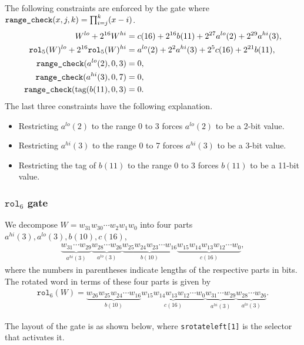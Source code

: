 \documentclass[10pt]{article}
\begin{document}
The following constraints are enforced by the gate where $\texttt{range\textunderscore check}(x, j, k) = \prod_{i=j}^k (x-i)$.
\begin{align*}
  W^{lo} + 2^{16} W^{hi} & = c(16) + 2^{16} b(11) + 2^{27} a^{lo}(2) + 2^{29} a^{hi}(3),\\
  \texttt{rol}_5(W)^{lo} + 2^{16} \texttt{rol}_5(W)^{hi} & = a^{lo}(2) + 2^{2} a^{hi}(3) + 2^5 c(16) + 2^{21} b(11),\\
  \texttt{range\textunderscore check}(a^{lo}(2), 0, 3) & = 0,\\
  \texttt{range\textunderscore check}(a^{hi}(3), 0, 7) & = 0,\\
  \texttt{range\textunderscore check}(\text{tag}(b(11), 0, 3) & = 0.
\end{align*}
The last three constraints have the following explanation.
\begin{itemize}
\item Restricting $a^{lo}(2)$ to the range 0 to 3 forces $a^{lo}(2)$ to be a 2-bit value.
\item Restricting $a^{hi}(3)$ to the range 0 to 7 forces $a^{hi}(3)$ to be a 3-bit value.
\item Restricting the tag of $b(11)$ to the range 0 to 3 forces $b(11)$ to be a 11-bit value.
\end{itemize}

\subsubsection{$\texttt{rol}_6$ gate}%
\label{sec:rol_6_gate}
We decompose $W = w_{31}w_{30}\cdots w_2w_1w_0$ into four parts $a^{hi}(3), a^{lo}(3), b(10), c(16)$,
\begin{align*}
  \underbrace{w_{31}\cdots w_{29}}_{a^{hi}(3)} \underbrace{w_{28}\cdots w_{26}}_{a^{lo}(3)}
  \underbrace{w_{25}w_{24}w_{23}\cdots w_{16}}_{b(10)} \underbrace{w_{15}w_{14}w_{13}w_{12}\cdots w_{0}}_{c(16)},
\end{align*}
where the numbers in parentheses indicate lengths of the respective parts in bits. The rotated word in terms of these four parts is given by
\begin{align*}
  \texttt{rol}_6(W) = 
  \underbrace{w_{26}w_{25}w_{24}\cdots w_{16}}_{b(10)} \underbrace{w_{15}w_{14}w_{13}w_{12}\cdots w_{0}}_{c(16)}
\underbrace{w_{31}\cdots w_{29}}_{a^{hi}(3)} \underbrace{w_{28}\cdots w_{26}}_{a^{lo}(3)}.
\end{align*}

The layout of the gate is as shown below, where \texttt{s\textunderscore rotate\textunderscore left[1]} is the selector that activates it.
\end{document}
